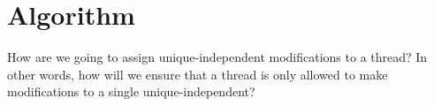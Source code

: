 \section{Algorithm}

How are we going to assign unique-independent modifications to a thread? In other words, how will we ensure that a thread is only allowed to make modifications to a single unique-independent?